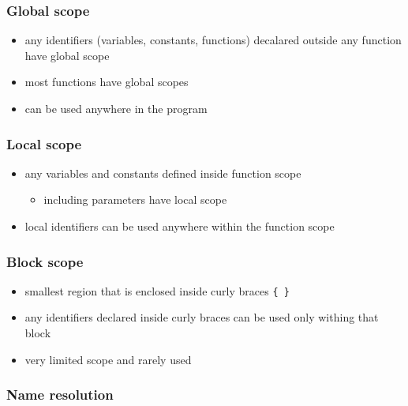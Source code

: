 \documentclass[11pt]{article}
\providecommand{\tightlist}{%
      \setlength{\itemsep}{0pt}\setlength{\parskip}{0pt}}
\begin{document}
\hypertarget{global-scope}{%
\subsubsection{Global scope}\label{global-scope}}

\begin{itemize}
\tightlist
\item
  any identifiers (variables, constants, functions) decalared outside
  any function have global scope
\item
  most functions have global scopes
\item
  can be used anywhere in the program
\end{itemize}

\hypertarget{local-scope}{%
\subsubsection{Local scope}\label{local-scope}}

\begin{itemize}
\tightlist
\item
  any variables and constants defined inside function scope

  \begin{itemize}
  \tightlist
  \item
    including parameters have local scope
  \end{itemize}
\item
  local identifiers can be used anywhere within the function scope
\end{itemize}

\hypertarget{block-scope}{%
\subsubsection{Block scope}\label{block-scope}}

\begin{itemize}
\tightlist
\item
  smallest region that is enclosed inside curly braces \texttt{\{\ \}}
\item
  any identifiers declared inside curly braces can be used only withing
  that block
\item
  very limited scope and rarely used
\end{itemize}

\hypertarget{name-resolution}{%
\subsubsection{Name resolution}\label{name-resolution}}
\end{document}
